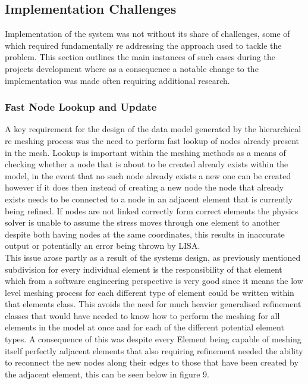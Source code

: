 

\subsection{Implementation Challenges}
Implementation of the system was not without its share of challenges, some of which required fundamentally re addressing the approach used to tackle the problem. This section outlines the main instances of such cases during the projects development where as a consequence a notable change to the implementation was made often requiring additional research.

\subsubsection{Fast Node Lookup and Update}
A key requirement for the design of the data model generated by the hierarchical re meshing process was the need to perform fast lookup of nodes already present in the mesh. Lookup is important within the meshing methods as a means of checking whether a node that is about to be created already exists within the model, in the event that no such node already exists a new one can be created however if it does then instead of creating a new node the node that already exists needs to be connected to a node in an adjacent element that is currently being refined. If nodes are not linked correctly form correct elements the physics solver is unable to assume the stress moves through one element to another despite both having nodes at the same coordinates, this results in inaccurate output or potentially an error being thrown by LISA. \\ 

\noindent
This issue arose partly as a result of the systems design, as previously mentioned subdivision for every individual element is the responsibility of that element which from a software engineering perspective is very good since it means the low level meshing process for each different type of element could be written within that elements class. This avoids the need for much heavier generalised refinement classes that would have needed to know how to perform the meshing for all elements in the model at once and for each of the different potential element types. A consequence of this was despite every Element being capable of meshing itself perfectly adjacent elements that also requiring refinement needed the ability to reconnect the new nodes along their edges to those that have been created by the adjacent element, this can be seen below in figure 9. \\ 


